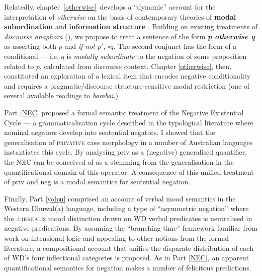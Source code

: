 \documentclass[12pt,dvipsnames]{report}
\begin{document}
Relatedly, chapter~\ref{otherwise}~develops a ``dynamic'' account for the interpretation of \textit{otherwise} on the basis of contemporary theories of \textbf{modal subordination} \citep{Roberts1989,Roberts2020,Roberts1995} and \textbf{information structure} \citep[e.g.][]{Roberts2012}. Building on existing treatments of \textit{discourse anaphora} (\citet{Webber2001,Kruijff-Korbayova2001}), we propose to treat a sentence of the form \textbf{\textit{p otherwise q}} as asserting both $ p $ and \textit{if not $ p' $, $ \square q $}. The second conjunct has the form of a conditional --- i.e. $ q $ is \textit{modally subordinate} to the negation of some proposition related to $ p $, calculated from discourse context. Chapter \ref{otherwise}, then, constituted an exploration of a lexical item that encodes negative conditionality and requires a pragmatic/discourse structure-sensitive modal restriction (one of several available readings to \textit{bambai}.)

Part \ref{NEC} proposed a formal semantic treatment of the Negative Existential Cycle --- a grammaticalisation cycle described in the typological literature where nominal negators develop into sentential negators. I showed that the generalisation of \textsc{privative} case morphology in a number of Australian languages instantiates this cycle. By analysing \gls{priv} as a (negative) generalised quantifier, the NƎC can be conceived of as a stemming from the generalisation in the quantificational domain of this operator. A consequence of this unified treatment of \gls{priv} and \gls{neg} is a modal semantics for sentential negation.

Finally, Part \ref{yolŋu} comprised an account of verbal mood semantics in the Western Dhuwal(a) language, including a type of ``asymmetric negation'' where the ±\textsc{irrealis} mood distinction drawn on WD verbal predicates is neutralised in negative predications. By assuming the ``branching time'' framework familiar from work on intensional logic and appealing to other notions from the formal literature, a compositional account that unifies the disparate distribution of each of WD's four inflectional categories is proposed. As in Part \ref{NEC}, an apparent quantificational semantics for negation makes a number of felicitous predictions.
\end{document}

